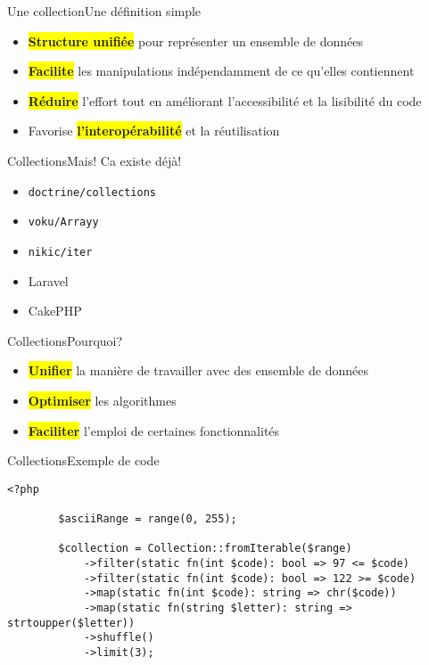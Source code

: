 \begin{frame}{Une collection}{Une définition simple}
    \begin{itemize}[<+->]
        \item \colorbox{yellow}{\textbf{Structure unifiée}} pour représenter un ensemble de données
        \item \colorbox{yellow}{\textbf{Facilite}} les manipulations indépendamment de ce qu'elles contiennent
        \item \colorbox{yellow}{\textbf{Réduire}} l'effort tout en améliorant l'accessibilité et la lisibilité du code
        \item Favorise \colorbox{yellow}{\textbf{l'interopérabilité}} et la réutilisation
    \end{itemize}
\end{frame}

\begin{frame}{Collections}{Mais! Ca existe déjà!}
    \begin{itemize}[<+->]
        \item \texttt{doctrine/collections}
        \item \texttt{voku/Arrayy}
        \item \texttt{nikic/iter}
        \item Laravel
        \item CakePHP
    \end{itemize}
\end{frame}

\begin{frame}{Collections}{Pourquoi?}
    \begin{itemize}[<+->]
        \item \colorbox{yellow}{\textbf{Unifier}} la manière de travailler avec des ensemble de données
        \item \colorbox{yellow}{\textbf{Optimiser}} les algorithmes
        \item \colorbox{yellow}{\textbf{Faciliter}} l'emploi de certaines fonctionnalités
    \end{itemize}
\end{frame}

\begin{frame}[fragile]{Collections}{Exemple de code}
    \begin{lstlisting}[firstnumber=1]
        <?php

        $asciiRange = range(0, 255);

        $collection = Collection::fromIterable($range)
            ->filter(static fn(int $code): bool => 97 <= $code)
            ->filter(static fn(int $code): bool => 122 >= $code)
            ->map(static fn(int $code): string => chr($code))
            ->map(static fn(string $letter): string => strtoupper($letter))
            ->shuffle()
            ->limit(3);

    \end{lstlisting}
\end{frame}

